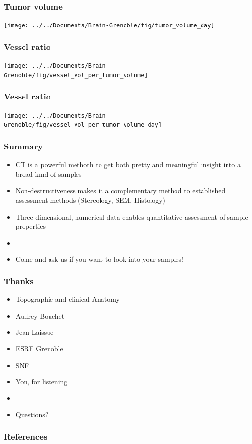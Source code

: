 \documentclass{beamer}              %
\newcommand{\uct}{\si{\micro}CT\xspace}
\begin{document}
\begin{frame}
	\frametitle{Tumor volume}
	\texttt{[image: ../../Documents/Brain-Grenoble/fig/tumor\_volume\_day]}
\end{frame}

\begin{frame}
	\frametitle{Vessel ratio}
	\texttt{[image: ../../Documents/Brain-Grenoble/fig/vessel\_vol\_per\_tumor\_volume]}
\end{frame}

\begin{frame}
	\frametitle{Vessel ratio}
	\texttt{[image: ../../Documents/Brain-Grenoble/fig/vessel\_vol\_per\_tumor\_volume\_day]}
\end{frame}

\begin{frame}
	\frametitle{Summary}
	\begin{itemize}
		\item \uct is a powerful methoth to get both pretty and meaningful insight into a broad kind of samples
		\item Non-destructiveness makes it a complementary method to established assessment methods (Stereology, SEM, Histology)
		\item Three-dimensional, numerical data enables quantitative assessment of sample properties
		\item[]
		\pause
		\item Come and ask us if you want to look into your samples!
	\end{itemize}
\end{frame}

\begin{frame}
	\frametitle{Thanks}
	\begin{itemize}
		\item Topographic and clinical Anatomy
		\item Audrey Bouchet
		\item Jean Laissue
		\item ESRF Grenoble
		\item SNF
		\pause
		\item You, for listening
		\item[]
		\pause
		\item Questions?
	\end{itemize}
\end{frame}

\begin{frame}[allowframebreaks]
	\frametitle{References}
	\renewcommand*{\bibfont}{\tiny}
	\printbibliography
\end{frame}
\end{document}
